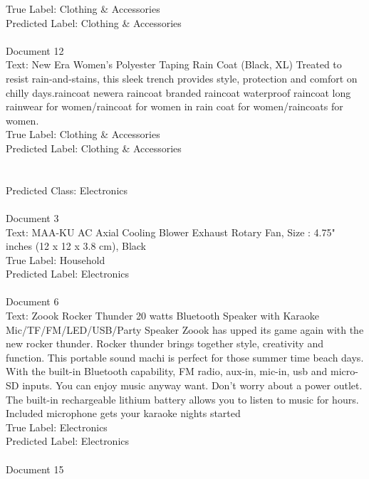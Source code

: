 \documentclass[a4paper,12pt]{article}
\begin{document}
{True Label: Clothing \& Accessories\\
Predicted Label: Clothing \& Accessories
\\
\\Document 12\\
Text: New Era Women's Polyester Taping Rain Coat (Black, XL) Treated to resist rain-and-stains, this sleek trench provides style, protection and comfort on chilly days.raincoat newera raincoat branded raincoat waterproof raincoat long rainwear for women/raincoat for women in rain coat for women/raincoats for women.\\
True Label: Clothing \& Accessories\\
Predicted Label: Clothing \& Accessories
\\
\\\\ Predicted Class: Electronics\\
\\ Document 3\\
Text: MAA-KU AC Axial Cooling Blower Exhaust Rotary Fan, Size : 4.75" inches (12 x 12 x 3.8 cm), Black\\
True Label: Household\\
Predicted Label: Electronics
\\
\\ Document 6\\
Text: Zoook Rocker Thunder 20 watts Bluetooth Speaker with Karaoke Mic/TF/FM/LED/USB/Party Speaker Zoook has upped its game again with the new rocker thunder. Rocker thunder brings together style, creativity and function. This portable sound machi is perfect for those summer time beach days. With the built-in Bluetooth capability, FM radio, aux-in, mic-in, usb and micro-SD inputs. You can enjoy music anyway want. Don't worry about a power outlet. The built-in rechargeable lithium battery allows you to listen to music for hours. Included microphone gets your karaoke nights started\\
True Label: Electronics\\
Predicted Label: Electronics
\\
\\ Document 15\\
}
\end{document}

